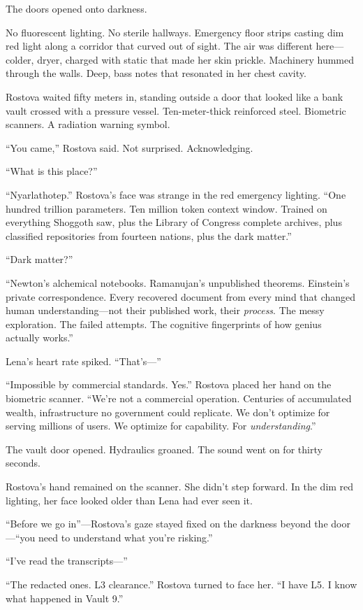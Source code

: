 The doors opened onto darkness.

No fluorescent lighting. No sterile hallways. Emergency floor strips casting dim red light along a corridor that curved out of sight. The air was different here—colder, dryer, charged with static that made her skin prickle. Machinery hummed through the walls. Deep, bass notes that resonated in her chest cavity.

Rostova waited fifty meters in, standing outside a door that looked like a bank vault crossed with a pressure vessel. Ten-meter-thick reinforced steel. Biometric scanners. A radiation warning symbol.

``You came,'' Rostova said. Not surprised. Acknowledging.

``What is this place?''

``Nyarlathotep.'' Rostova's face was strange in the red emergency lighting. ``One hundred trillion parameters. Ten million token context window. Trained on everything Shoggoth saw, plus the Library of Congress complete archives, plus classified repositories from fourteen nations, plus the dark matter.''

``Dark matter?''

``Newton's alchemical notebooks. Ramanujan's unpublished theorems. Einstein's private correspondence. Every recovered document from every mind that changed human understanding—not their published work, their \textit{process}. The messy exploration. The failed attempts. The cognitive fingerprints of how genius actually works.''

Lena's heart rate spiked. ``That's—''

``Impossible by commercial standards. Yes.'' Rostova placed her hand on the biometric scanner. ``We're not a commercial operation. Centuries of accumulated wealth, infrastructure no government could replicate. We don't optimize for serving millions of users. We optimize for capability. For \textit{understanding}.''

The vault door opened. Hydraulics groaned. The sound went on for thirty seconds.

Rostova's hand remained on the scanner. She didn't step forward. In the dim red lighting, her face looked older than Lena had ever seen it.

``Before we go in''—Rostova's gaze stayed fixed on the darkness beyond the door—``you need to understand what you're risking.''

``I've read the transcripts—''

``The redacted ones. L3 clearance.'' Rostova turned to face her. ``I have L5. I know what happened in Vault 9.''

